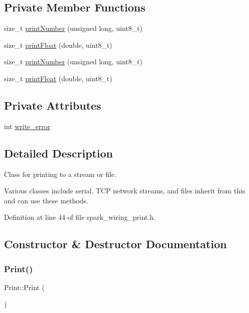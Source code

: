 \subsection*{Private Member Functions}
\begin{DoxyCompactItemize}
\item 
size\+\_\+t \hyperlink{class_print_abe7ee1c0946399820a61e1ec39419ee2}{print\+Number} (unsigned long, uint8\+\_\+t)
\item 
size\+\_\+t \hyperlink{class_print_a449fd5f2ab1fb43c3e3b10f53d18b1e8}{print\+Float} (double, uint8\+\_\+t)
\item 
size\+\_\+t \hyperlink{class_print_abe7ee1c0946399820a61e1ec39419ee2}{print\+Number} (unsigned long, uint8\+\_\+t)
\item 
size\+\_\+t \hyperlink{class_print_a449fd5f2ab1fb43c3e3b10f53d18b1e8}{print\+Float} (double, uint8\+\_\+t)
\end{DoxyCompactItemize}
\subsection*{Private Attributes}
\begin{DoxyCompactItemize}
\item 
int \hyperlink{class_print_ae922182b62afa3b8434397b7a54e70c4}{write\+\_\+error}
\end{DoxyCompactItemize}


\subsection{Detailed Description}
Class for printing to a stream or file. 

Various classes include serial, T\+CP network streams, and files inherit from this and can use these methods. 

Definition at line 44 of file spark\+\_\+wiring\+\_\+print.\+h.



\subsection{Constructor \& Destructor Documentation}
\mbox{\label{class_print_a1b9fe938883bb7b4bce8fba012dab112}} 
\subsubsection{\texorpdfstring{Print()}{Print()}\hspace{0.1cm}{\footnotesize\ttfamily [1/2]}}
{\footnotesize\ttfamily Print\+::\+Print (\begin{DoxyParamCaption}{ }\end{DoxyParamCaption})\hspace{0.3cm}{\ttfamily [inline]}}



